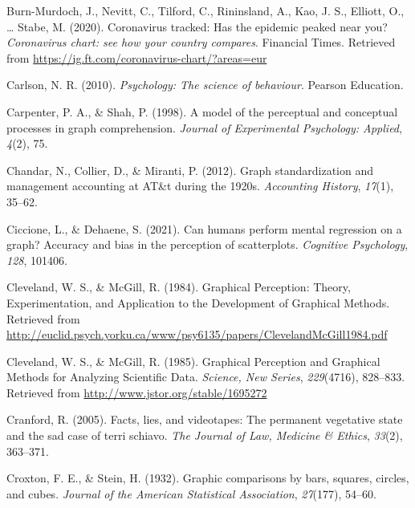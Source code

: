 \documentclass[print]{nuthesis}
\newlength{\cslhangindent}
\newenvironment{CSLReferences}[2]%
{\setlength{\parindent}{0pt}%
\everypar{\setlength{\hangindent}{\cslhangindent}}\ignorespaces}%
{\par}
\begin{document}
\begin{CSLReferences}{1}{0}
\leavevmode{}%
Burn-Murdoch, J., Nevitt, C., Tilford, C., Rininsland, A., Kao, J. S., Elliott, O., \ldots{} Stabe, M. (2020). Coronavirus tracked: Has the epidemic peaked near you? \emph{Coronavirus chart: see how your country compares}. Financial Times. Retrieved from \url{https://ig.ft.com/coronavirus-chart/?areas=eur}

\leavevmode{}%
Carlson, N. R. (2010). \emph{Psychology: The science of behaviour}. Pearson Education.

\leavevmode{}%
Carpenter, P. A., \& Shah, P. (1998). A model of the perceptual and conceptual processes in graph comprehension. \emph{Journal of Experimental Psychology: Applied}, \emph{4}(2), 75.

\leavevmode{}%
Chandar, N., Collier, D., \& Miranti, P. (2012). Graph standardization and management accounting at AT\&t during the 1920s. \emph{Accounting History}, \emph{17}(1), 35--62.

\leavevmode{}%
Ciccione, L., \& Dehaene, S. (2021). Can humans perform mental regression on a graph? Accuracy and bias in the perception of scatterplots. \emph{Cognitive Psychology}, \emph{128}, 101406.

\leavevmode{}%
Cleveland, W. S., \& McGill, R. (1984). Graphical {Perception}: {Theory}, {Experimentation}, and {Application} to the {Development} of {Graphical} {Methods}. Retrieved from \url{http://euclid.psych.yorku.ca/www/psy6135/papers/ClevelandMcGill1984.pdf}

\leavevmode{}%
Cleveland, W. S., \& McGill, R. (1985). Graphical {Perception} and {Graphical} {Methods} for {Analyzing} {Scientific} {Data}. \emph{Science, New Series}, \emph{229}(4716), 828--833. Retrieved from \url{http://www.jstor.org/stable/1695272}

\leavevmode{}%
Cranford, R. (2005). Facts, lies, and videotapes: The permanent vegetative state and the sad case of terri schiavo. \emph{The Journal of Law, Medicine \& Ethics}, \emph{33}(2), 363--371.

\leavevmode{}%
Croxton, F. E., \& Stein, H. (1932). Graphic comparisons by bars, squares, circles, and cubes. \emph{Journal of the American Statistical Association}, \emph{27}(177), 54--60.


\end{CSLReferences}
\end{document}
